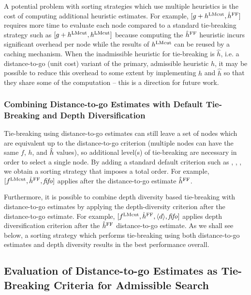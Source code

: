 A potential problem with sorting strategies which use multiple heuristics is the cost of computing additional
heuristic estimates. For example, $[g+h^{\text{LMcut}},\hat{h}^{\text{FF}}]$ requires more time to evaluate each node compared to a standard tie-breaking strategy such as $[g+h^{\text{LMcut}},h^{\text{LMcut}}]$ because computing the $\hat{h}^{\text{FF}}$ heuristic incurs significant overhead per node while the results of $h^{\text{LMcut}}$ can be reused by a caching mechanism.
When the inadmissible heuristic for tie-breaking is $\hat{h}$, i.e. a distance-to-go (unit cost) variant of the primary, admissible heuristic $h$, it may be possible to reduce this overhead to some extent by implementing $h$ and $\hat{h}$ so that they share some of the computation  -- this is a direction for future work.

\subsubsection{Combining Distance-to-go Estimates with Default Tie-Breaking and Depth Diversification} %

Tie-breaking using distance-to-go estimates can still leave a set of nodes which are equivalent up to the distance-to-go criterion (multiple nodes can have the same $f$, $h$, and $\hat{h}$ values), so additional level(s) of tie-breaking are necessary in order to select a single node. By adding a standard default criterion such as \fifo, \lifo, \ro, we obtain a sorting strategy that imposes a total order. For example, 
$[f^{\text{LMcut}},\hat{h}^{\text{FF}},{\text{\textit{fifo}}}]$
 applies \fifo after the distance-to-go estimate $\hat{h}^{\text{FF}}$.

Furthermore, it is possible to combine depth diversity based tie-breaking with distance-to-go estimates by applying the depth-diversity criterion after the distance-to-go estimate. For example, 
$[f^{\text{LMcut}},\hat{h}^{\text{FF}},{\left<d\right>},{\text{\textit{fifo}}}]$ applies depth diversification criterion after the $\hat{h}^{\text{FF}}$ distance-to-go estimate.
As we shall see below, a sorting strategy which performs tie-breaking using both distance-to-go estimates and depth diversity results in the best performance overall.



\subsection{Evaluation of Distance-to-go Estimates as Tie-Breaking Criteria for Admissible Search}

